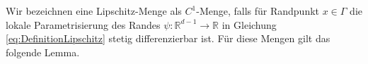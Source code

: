 \documentclass{scrartcl}
\newcounter{everything}
\newtheorem{corollary}[everything]{Korollar}
\def\R{\mathbb{R}}
\def\e{\varepsilon}
\newcommand{\tir}{\tilde{r}}
\newcommand{\tiB}{\tilde{B}}
\DeclareMathOperator{\epi}{epi}			%
\DeclarePairedDelimiter{\abs}{\lvert}{\rvert}
\DeclarePairedDelimiter{\norm}{\lVert}{\rVert}
\begin{document}

Wir bezeichnen eine Lipschitz-Menge als $C^1$-Menge, falls für Randpunkt $x\in\Gamma$ die lokale Parametrisierung des Randes $\psi\colon\R^{d-1}\to\R$ in Gleichung \eqref{eq:DefinitionLipschitz} stetig differenzierbar ist. Für diese Mengen gilt das folgende Lemma.
\end{document}
